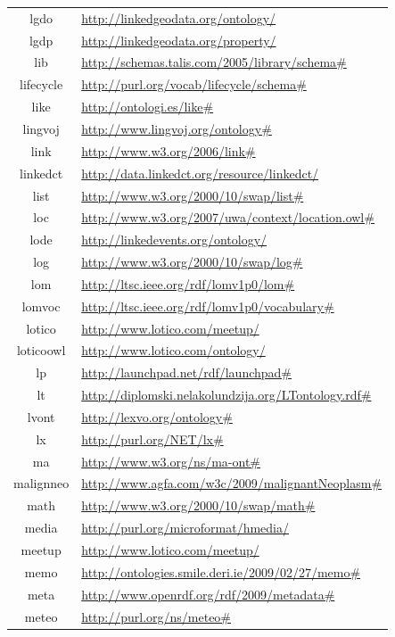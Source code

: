 \documentclass{article}
\begin{document}
\begin{longtable}{ c | p{8cm} }
		lgdo & \url{http://linkedgeodata.org/ontology/} \\
		lgdp & \url{http://linkedgeodata.org/property/} \\
		lib & \url{http://schemas.talis.com/2005/library/schema#} \\
		lifecycle & \url{http://purl.org/vocab/lifecycle/schema#} \\
		like & \url{http://ontologi.es/like#} \\
		lingvoj & \url{http://www.lingvoj.org/ontology#} \\
		link & \url{http://www.w3.org/2006/link#} \\
		linkedct & \url{http://data.linkedct.org/resource/linkedct/} \\
		list & \url{http://www.w3.org/2000/10/swap/list#} \\
		loc & \url{http://www.w3.org/2007/uwa/context/location.owl#} \\
		lode & \url{http://linkedevents.org/ontology/} \\
		log & \url{http://www.w3.org/2000/10/swap/log#} \\
		lom & \url{http://ltsc.ieee.org/rdf/lomv1p0/lom#} \\
		lomvoc & \url{http://ltsc.ieee.org/rdf/lomv1p0/vocabulary#} \\
		lotico & \url{http://www.lotico.com/meetup/} \\
		loticoowl & \url{http://www.lotico.com/ontology/} \\
		lp & \url{http://launchpad.net/rdf/launchpad#} \\
		lt & \url{http://diplomski.nelakolundzija.org/LTontology.rdf#} \\
		lvont & \url{http://lexvo.org/ontology#} \\
		lx & \url{http://purl.org/NET/lx#} \\
		ma & \url{http://www.w3.org/ns/ma-ont#} \\
		malignneo & \url{http://www.agfa.com/w3c/2009/malignantNeoplasm#} \\
		math & \url{http://www.w3.org/2000/10/swap/math#} \\
		media & \url{http://purl.org/microformat/hmedia/} \\
		meetup & \url{http://www.lotico.com/meetup/} \\
		memo & \url{http://ontologies.smile.deri.ie/2009/02/27/memo#} \\
		meta & \url{http://www.openrdf.org/rdf/2009/metadata#} \\
		meteo & \url{http://purl.org/ns/meteo#} \\

\end{longtable}
\end{document}
